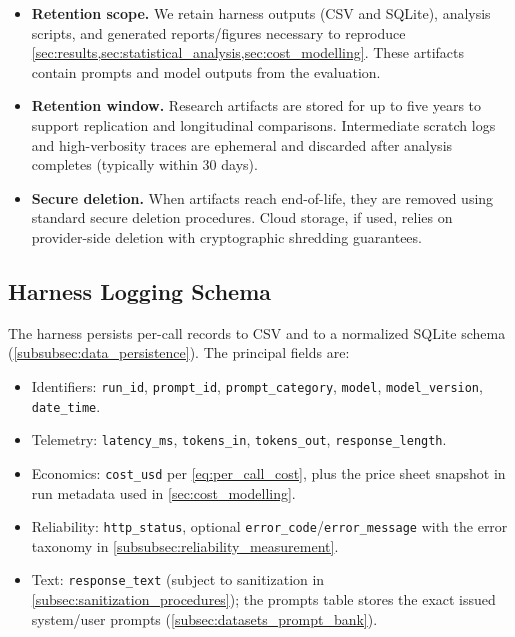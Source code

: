 \begin{itemize}
\item \textbf{Retention scope.} We retain harness outputs (CSV and SQLite), analysis scripts, and generated reports/figures necessary to reproduce \cref{sec:results,sec:statistical_analysis,sec:cost_modelling}. These artifacts contain prompts and model outputs from the evaluation.
\item \textbf{Retention window.} Research artifacts are stored for up to five years to support replication and longitudinal comparisons. Intermediate scratch logs and high-verbosity traces are ephemeral and discarded after analysis completes (typically within 30 days).
\item \textbf{Secure deletion.} When artifacts reach end-of-life, they are removed using standard secure deletion procedures. Cloud storage, if used, relies on provider-side deletion with cryptographic shredding guarantees.
\end{itemize}

\subsection{Harness Logging Schema}\label{subsec:database_schema}

The harness persists per-call records to CSV and to a normalized SQLite schema (\cref{subsubsec:data_persistence}). The principal fields are:

\begin{itemize}
\item Identifiers: \texttt{run\_id}, \texttt{prompt\_id}, \texttt{prompt\_category}, \texttt{model}, \texttt{model\_version}, \texttt{date\_time}.
\item Telemetry: \texttt{latency\_ms}, \texttt{tokens\_in}, \texttt{tokens\_out}, \texttt{response\_length}.
\item Economics: \texttt{cost\_usd} per \cref{eq:per_call_cost}, plus the price sheet snapshot in run metadata used in \cref{sec:cost_modelling}.
\item Reliability: \texttt{http\_status}, optional \texttt{error\_code}/\texttt{error\_message} with the error taxonomy in \cref{subsubsec:reliability_measurement}.
\item Text: \texttt{response\_text} (subject to sanitization in \cref{subsec:sanitization_procedures}); the prompts table stores the exact issued system/user prompts (\cref{subsec:datasets_prompt_bank}).
\end{itemize}

